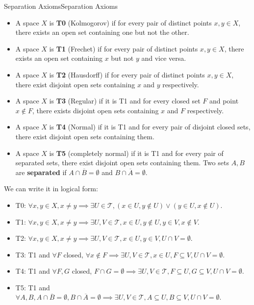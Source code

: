 \documentclass[../main.tex]{subfiles}
\begin{document}
\begin{definition}{Separation Axioms}{Separation Axioms}
	\begin{itemize}
		\item A space $X$ is \textbf{T0} (Kolmogorov) if for every pair of distinct points $x,y\in X$, there exists an open set containing one but not the other.
		\item A space $X$ is \textbf{T1} (Frechet) if for every pair of distinct points $x,y\in X$, there exists an open set containing $x$ but not $y$ and vice versa.
		\item A space $X$ is \textbf{T2} (Hausdorff) if for every pair of distinct points $x,y\in X$, there exist disjoint open sets containing $x$ and $y$ respectively.
		\item A space $X$ is \textbf{T3} (Regular) if it is T1 and for every closed set $F$ and point $x\notin F$, there exists disjoint open sets containing $x$ and $F$ respectively.
		\item A space $X$ is \textbf{T4} (Normal) if it is T1 and for every pair of disjoint closed sets, there exist disjoint open sets containing them.
		\item A space $X$ is \textbf{T5} (completely normal) if it is T1 and for every pair of separated sets, there exist disjoint open sets containing them. Two sets $A,B$ are \textbf{separated} if $A\cap \overline{B} = \emptyset$ and $B\cap \overline{A} = \emptyset$.
	\end{itemize}
	We can write it in logical form:
	\begin{itemize}
		\item T0: $\forall x,y\in X, x\neq y \implies \exists U\in \mathcal{T}, (x\in U, y\notin U) \lor (y\in U, x\notin U)$.
		\item T1: $\forall x,y\in X, x\neq y \implies \exists U,V\in \mathcal{T}, x\in U, y\notin U, y\in V, x\notin V$.
		\item T2: $\forall x,y\in X, x\neq y \implies \exists U,V\in \mathcal{T}, x\in U, y\in V, U\cap V = \emptyset$.
		\item T3: T1 and $\forall F$ closed, $\forall x\notin F \implies \exists U,V\in \mathcal{T}, x\in U, F\subseteq V, U\cap V = \emptyset$.
		\item T4: T1 and $\forall F,G$ closed, $F\cap G = \emptyset \implies \exists U,V\in \mathcal{T}, F\subseteq U, G\subseteq V, U\cap V = \emptyset$.
		\item T5: T1 and $\forall A,B,A\cap \overline{B} = \emptyset, B\cap \overline{A} = \emptyset \implies \exists U,V\in \mathcal{T}, A\subseteq U, B\subseteq V, U\cap V = \emptyset$.
	\end{itemize}
\end{definition}
\end{document}
